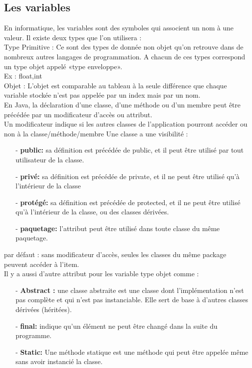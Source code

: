 \subsection{Les variables}
En informatique, les variables sont des symboles qui associent un nom à une valeur. Il existe deux types que l’on utilisera :\\
Type Primitive : Ce sont des types de donnée non objet qu'on retrouve dans de nombreux autres langages de programmation. A chacun de ces types correspond un type objet appelé «type enveloppe».\\
Ex : float,int \\
Objet : L'objet est comparable au tableau à la seule différence que chaque variable stockée n’est pas appelée par un index mais par un nom.\\
En Java, la déclaration d'une classe, d'une méthode ou d'un membre peut être précédée par un modificateur d'accès ou attribut.\\
Un modificateur indique si les autres classes de l'application pourront accéder ou non à la classe/méthode/membre 
Une classe a une visibilité :
\begin{itemize}
\item[-]\textbf{public:}  sa définition est précédée de public, et il peut être utilisé par tout utilisateur de la classe.
\item[-]\textbf{privé:} sa définition est précédée de private, et il ne peut être utilisé qu’à l’intérieur de la classe
\item[-]\textbf{protégé:} sa définition est précédée de protected, et il ne peut être utilisé qu’à l’intérieur de la classe, ou des classes dérivées.
\item[-]\textbf{paquetage:} l’attribut peut être utilisé dans toute classe du même paquetage.
\end{itemize}
par défaut : sans modificateur d'accès, seules les classes du même package peuvent accéder à l'item.\\
Il y a aussi d’autre attribut pour les variable type objet comme :
\begin{itemize}
\item[-]\textbf{Abstract :} une classe abstraite est une classe dont l'implémentation n'est pas complète et qui n'est pas instanciable. Elle sert de base à d'autres classes dérivées (héritées).
\item[-]\textbf{final:} indique qu'un élément ne peut être changé dans la suite du programme.
\item[-]\textbf{Static:} Une méthode statique est une méthode qui peut être appelée même sans avoir instancié la classe.
\end{itemize}
